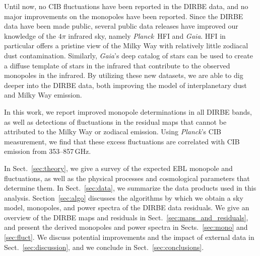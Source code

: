 \documentclass{aa}
\def\Planck{\textit{Planck}}
\begin{document}
Until now, no CIB fluctuations have been reported in the DIRBE data, and no major improvements on the monopoles have been reported. Since the DIRBE data have been made public, several public data releases have improved our knowledge of the $4\pi$ infrared sky, namely \Planck\ HFI and \textit{Gaia}. HFI in particular offers a pristine view of the Milky Way with relatively little zodiacal dust contamination. Similarly, \textit{Gaia}'s deep catalog of stars can be used to create a diffuse template of stars in the infrared that contribute to the observed monopoles in the infrared. By utilizing these new datasets, we are able to dig deeper into the DIRBE data, both improving the model of interplanetary dust and Milky Way emission.

In this work, we report improved monopole determinations in all DIRBE bands, as well as detections of fluctuations in the residual maps that cannot be attributed to the Milky Way or zodiacal emission. Using \Planck's CIB measurement, we find that these excess fluctuations are correlated with CIB emission from 353--857\,GHz.

In Sect.~\ref{sec:theory}, we give a survey of the expected EBL monopole and fluctuations, as well as the physical processes and cosmological parameters that determine them. In Sect.~\ref{sec:data}, we summarize the data products used in this analysis. Section~\ref{sec:algo} discusses the algorithms by which we obtain a sky model, monopoles, and power spectra of the DIRBE data residuals. We give an overview of the DIRBE maps and residuals in Sect.~\ref{sec:maps_and_residuals}, and present the derived monopoles and power spectra in Sects.~\ref{sec:mono} and \ref{sec:fluct}. We discuss potential improvements and the impact of external data in Sect.~\ref{sec:discussion}, and we conclude in Sect.~\ref{sec:conclusions}.
\end{document}
